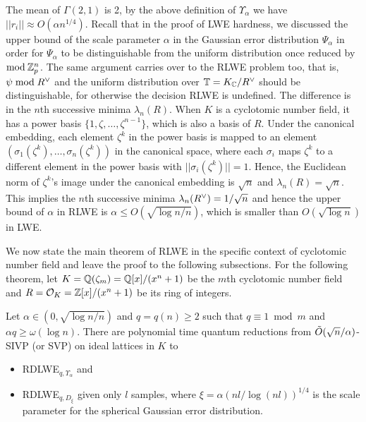 \documentclass[../main.tex]{subfiles}
\begin{document}
The mean of $\Gamma(2,1)$ is 2, by the above definition of $\Upsilon_{\alpha}$ we have $||r_i|| \approx O(\alpha n^{1/4})$. Recall that in the proof of LWE hardness, we discussed the upper bound of the scale parameter $\alpha$ in the Gaussian error distribution $\Psi_{\alpha}$ in order for $\Psi_{\alpha}$ to be distinguishable from the uniform distribution once reduced by $\bmod \,\mathbb{Z}_p^n$. The same argument carries over to the RLWE problem too, that is, $\psi \bmod R^{\vee}$ and the uniform distribution over $\mathbb{T}=K_{\mathbb{C}}/R^{\vee}$ should be distinguishable, for otherwise the decision RLWE is undefined. The difference is in the $n$th successive minima $\lambda_n(R)$. When $K$ is a cyclotomic number field, it has a power basis $\{1, \zeta, \dots, \zeta^{n-1} \}$, which is also a basis of $R$. Under the canonical embedding, each element $\zeta^k$ in the power basis is mapped to an element $(\sigma_1(\zeta^k), \dots, \sigma_n(\zeta^k))$ in the canonical space, where each $\sigma_i$ maps $\zeta^k$ to a different element in the power basis with $||\sigma_i(\zeta^k)||=1$. Hence, the Euclidean norm of $\zeta^k$'s image under the canonical embedding is $\sqrt{n}$ and $\lambda_n(R)=\sqrt{n}$. This implies the $n$th successive minima $\lambda_n(R^{\vee})=1/\sqrt{n}$ and hence the upper bound of $\alpha$ in RLWE is $\alpha \le O(\sqrt{\log n/n})$, which is smaller than $O(\sqrt{\log n})$  in LWE. 

We now state the main theorem of RLWE in the specific context of cyclotomic number field and leave the proof to the following subsections. For the following theorem, let $K=\mathbb{Q}(\zeta_m)=\mathbb{Q}[x]/(x^n+1)$ be the $m$th cyclotomic number field and $R=\mathcal{O}_K=\mathbb{Z}[x]/(x^n+1)$ be its ring of integers. 

\begin{theorem}
\label{thm:svpToRLWE}
\reversemarginpar
{}
Let $\alpha \in (0, \sqrt{\log n/n})$ and $q=q(n) \ge 2$ such that $q \equiv 1 \bmod m$ and $\alpha q \ge \omega(\log n)$. There are polynomial time quantum reductions from $\Tilde{O}(\sqrt{n}/\alpha)$-SIVP (or SVP) on ideal lattices in $K$ to 
\begin{itemize}
    \item RDLWE$_{q, \Upsilon_{\alpha}}$ and
    \item RDLWE$_{q, D_{\xi}}$ given only $l$ samples, where $\xi=\alpha (nl / \log(nl))^{1/4}$ is the scale parameter for the spherical Gaussian error distribution.
\end{itemize}
\end{theorem}
\end{document}
